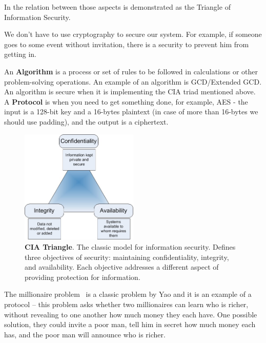 In  the relation between those aspects is demonstrated as the
Triangle of Information Security.

We don't have to use cryptography to secure our system. For example, if someone
goes to some event without invitation, there is a security to prevent him from
getting in.

An \textbf{Algorithm} is a process or set of rules to be followed in
calculations or other problem-solving operations. An example of an algorithm is
GCD/Extended GCD. An algorithm is secure when it is implementing the CIA triad
mentioned above. A \textbf{Protocol} is when you need to get something done, for
example, AES -  the input is a 128-bit key and a 16-bytes plaintext (in case of
more than 16-bytes we should use padding), and the output is a ciphertext.

\begin{figure}
    \centering
    \includegraphics[width=0.5\textwidth]{images/ch1_Intro/cia.jpg}
    \caption{\textbf{CIA Triangle}. The classic model for information security. Defines three objectives of security: maintaining confidentiality, integrity, and availability. Each objective addresses a different aspect of providing protection for information.}
    \label{fig:CIA}
\end{figure}

The millionaire problem~\cite{lin2005efficient} is a classic problem by Yao and
it is an example of a protocol – this problem asks whether two millionaires can
learn who is richer, without revealing to one another how much money they each
have. One possible solution, they could invite a poor man, tell him in secret
how much money each has, and the poor man will announce who is richer.  

